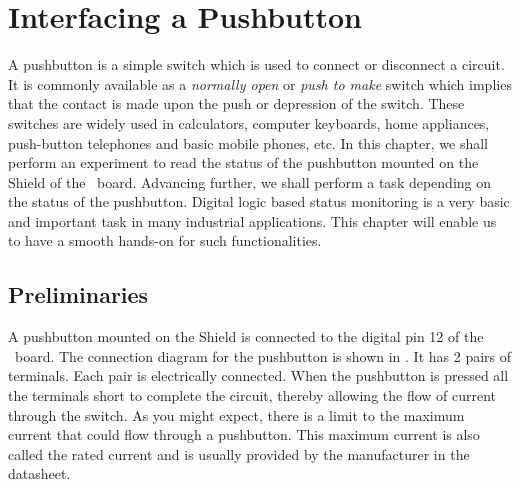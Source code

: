 \chapter{Interfacing a Pushbutton}
\thispagestyle{empty}
\label{pushbutton}

\newcommand{\LocPushfig}{\Origin/user-code/push/figures}
\newcommand{\LocPushscicode}{\Origin/user-code/push/scilab}
\newcommand{\LocPushscibrief}[1]{{\tt
    \seqsplit{Origin/user-code/push/scilab/#1}}, 
see \fnrefp{fn:file-loc}}
\newcommand{\LocPushardcode}{\Origin/user-code/push/arduino}
\newcommand{\LocPushardbrief}[1]{{\tt
    \seqsplit{Origin/user-code/push/arduino/#1}}, 
see \fnrefp{fn:file-loc}}


\newcommand{\LocPushpycode}{\Origin/user-code/push/python}
\newcommand{\LocPushpybrief}[1]{{\tt
    \seqsplit{Origin/user-code/push/python/#1}}, 
see \fnrefp{fn:file-loc}}

\newcommand{\LocPushjuliacode}{\Origin/user-code/push/julia}
\newcommand{\LocPushjuliabrief}[1]{{\tt
    \seqsplit{Origin/user-code/push/julia/#1}}, 
see \fnrefp{fn:file-loc}}


\newcommand{\LocPushOpenModelicacode}{\Origin/user-code/push/OpenModelica}  %
\newcommand{\LocPushOpenModelicabrief}[1]{{\tt \seqsplit{%
    Origin/user-code/led/OpenModelica/#1}}, see \fnrefp{fn:file-loc}} %

A pushbutton is a simple switch which is used to connect or disconnect
a circuit. It is commonly available as a \emph{normally open} or
\emph{push to make} switch which implies that the contact is made upon
the push or depression of the switch. These switches are widely used
in calculators, computer keyboards, home appliances, push-button
telephones and basic mobile phones, etc. In this chapter, we shall
perform an experiment to read the status of the pushbutton mounted
on the Shield of the \arduino\ board. Advancing further, we shall
perform a task depending on the status of the pushbutton. Digital
logic based status monitoring is a very basic and important task in
many industrial applications. This chapter will enable us to have a
smooth hands-on for such functionalities. 

\section{Preliminaries}
A pushbutton mounted on the Shield is connected to the digital pin 12
of the \arduino\ board. The connection diagram for the pushbutton is
shown in . It has 2 pairs of
terminals. Each pair is electrically connected. When the pushbutton is
pressed all the terminals short to complete the circuit, thereby
allowing the flow of current through the switch. As you might expect,
there is a limit to the maximum current that could flow through a
pushbutton. This maximum current is also called the rated current and
is usually provided by the manufacturer in the datasheet.  

